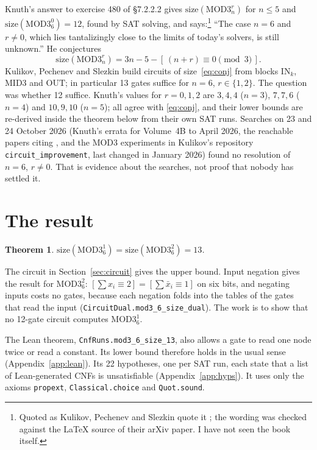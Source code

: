 \documentclass[11pt]{article}
\newtheorem{theorem}{Theorem}
\newcommand{\MOD}[2]{\mathrm{MOD3}^{#1}_{#2}}
\newcommand{\size}{\mathrm{size}}
\newcommand{\lean}[1]{\texttt{#1}}
\begin{document}
Knuth's answer to exercise 480 of \S7.2.2.2 \cite{knuth} gives $\size(\MOD{r}{n})$ for $n\le5$ and
$\size(\MOD{0}{6})=12$, found by SAT solving, and says:\footnote{Quoted as Kulikov, Pechenev and Slezkin quote
it \cite[p.~3]{kps}; the wording was checked against the \LaTeX{} source of their arXiv paper. I have not
seen the book itself.} ``The case $n = 6$ and $r \neq 0$, which lies tantalizingly close to the limits of
today's solvers, is still unknown.'' He conjectures
\begin{equation}\label{eq:conj}
\size(\MOD{r}{n}) = 3n-5-[\,(n+r)\equiv 0 \pmod 3\,].
\end{equation}
Kulikov, Pechenev and Slezkin \cite[Theorem~1]{kps} build circuits of size~\eqref{eq:conj} from blocks
$\mathrm{IN}_k$, $\mathrm{MID3}$ and $\mathrm{OUT}$; in particular 13 gates suffice for $n=6$, $r\in\{1,2\}$.
The question was whether 12 suffice. Knuth's values for $r=0,1,2$ are $3,4,4$ ($n=3$), $7,7,6$ ($n=4$) and $10,9,10$
($n=5$); all agree with \eqref{eq:conj}, and their lower bounds are re-derived inside the theorem below from
their own SAT runs. Searches on 23 and 24 October 2026 (Knuth's errata for Volume~4B to April 2026, the reachable
papers citing
\cite{kps}, and the MOD3 experiments in Kulikov's repository \texttt{circuit\_improvement}, last changed in
January 2026) found no resolution of $n=6$, $r\ne0$. That is evidence about the searches, not proof that nobody
has settled it.


\section{The result}\label{sec:result}

\begin{theorem}\label{thm:main}
$\size(\MOD{1}{6}) = \size(\MOD{2}{6}) = 13$.
\end{theorem}

The circuit in Section~\ref{sec:circuit} gives the upper bound. Input negation gives the result for $\MOD{2}{6}$:
$[\sum x_i\equiv2]=[\sum \bar x_i\equiv1]$ on six bits, and negating inputs costs no gates, because each
negation folds into the tables of the gates that read the input (\lean{CircuitDual.mod3\_6\_size\_dual}). The
work is to show that no 12-gate circuit computes $\MOD{1}{6}$.

The Lean theorem, \lean{CnfRuns.mod3\_6\_size\_13}, also allows a gate to read one node
twice or read a constant. Its lower bound therefore holds in the usual sense (Appendix~\ref{app:lean}). Its 22
hypotheses, one per SAT run, each state that a list of Lean-generated CNFs is unsatisfiable
(Appendix~\ref{app:hyps}). It uses only the axioms \lean{propext}, \lean{Classical.choice} and
\lean{Quot.sound}.
\end{document}
